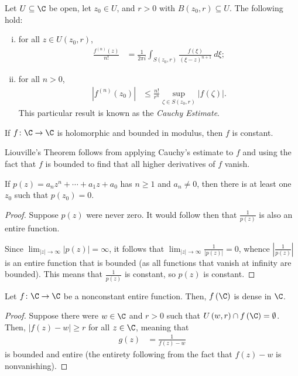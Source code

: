 \documentclass[10pt]{mypackage}
\begin{document}
\begin{corollary}
  Let $U\subseteq \C$ be open, let $z_0\in U$, and $r > 0$ with $B\left( z_0,r \right)\subseteq U$. The following hold:
  \begin{enumerate}[(i)]
    \item for all $z\in U\left( z_0,r \right)$,
      \begin{align*}
        \frac{f^{(n)}\left(z\right)}{n!} &= \frac{1}{2\pi i} \int_{S\left( z_0,r \right)}^{} \frac{f\left( \xi \right)}{\left( \xi-z \right)^{n+1}}\:d\xi;
      \end{align*}
    \item for all $n  > 0$,
      \begin{align*}
        \left\vert f^{(n)}\left( z_0 \right) \right\vert &\leq \frac{n!}{r^{n}} \sup_{\zeta\in S\left( z_0,r \right)} \left\vert f\left(\zeta\right) \right\vert.
      \end{align*}
      This particular result is known as the \textit{Cauchy Estimate}.
  \end{enumerate}
\end{corollary}
\begin{theorem}
  If $f\colon \C\rightarrow \C$ is holomorphic and bounded in modulus, then $f$ is constant.
\end{theorem}
Liouville's Theorem follows from applying Cauchy's estimate to $f$ and using the fact that $f$ is bounded to find that all higher derivatives of $f$ vanish.
\begin{theorem}
  If $p(z) = a_nz^{n} + \cdots + a_1 z + a_0$ has $n\geq 1$ and $a_n\neq 0$, then there is at least one $z_0$ such that $p\left( z_0 \right) = 0$.
\end{theorem}
\begin{proof}
  Suppose $p(z)$ were never zero. It would follow then that $\frac{1}{p(z)}$ is also an entire function.\newline
  
  Since $\lim_{|z|\rightarrow\infty}\left\vert p(z) \right\vert = \infty$, it follows that $\lim_{|z|\rightarrow\infty} \frac{1}{\left\vert p(z) \right\vert} = 0$, whence $ \left\vert \frac{1}{p(z)} \right\vert $ is an entire function that is bounded (as all functions that vanish at infinity are bounded). This means that $ \frac{1}{p(z)} $ is constant, so $p(z)$ is constant.
\end{proof}
\begin{corollary}
  Let $f\colon \C\rightarrow \C$ be a nonconstant entire function. Then, $f\left(\C\right)$ is dense in $\C$.
\end{corollary}
\begin{proof}
  Suppose there were $w\in\C$ and $r > 0$ such that $U\left( w,r \right)\cap f\left( \C \right) = \emptyset$. Then, $\left\vert f(z)-w \right\vert \geq r$ for all $z\in \C$, meaning that
  \begin{align*}
    g(z) &= \frac{1}{f(z)-w}
  \end{align*}
  is bounded and entire (the entirety following from the fact that $f(z)-w$ is nonvanishing).
\end{proof}
\end{document}
